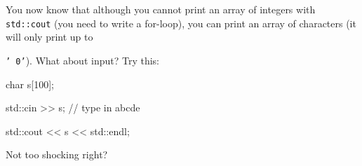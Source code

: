 You now know that although you cannot print an array of integers with \texttt{std::cout} (you need to write a for-loop), you can print an array of characters (it will only print up to

\texttt{'\ 0'}). What about input? Try this:

\begin{consolethree}[escapeinside=||]

char s[100];

std::cin >> s; // type in abcde

std::cout << s << std::endl;

\end{consolethree}



Not too shocking right?

